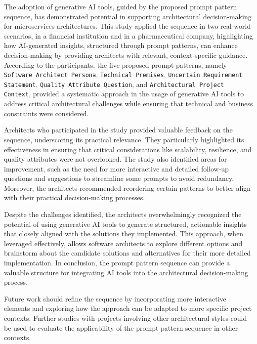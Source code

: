 \documentclass[runningheads]{llncs}
\begin{document}
The adoption of generative AI tools, guided by the proposed prompt pattern sequence, has demonstrated potential in supporting architectural decision-making for microservices architectures. 
This study applied the sequence in two real-world scenarios, in a financial institution and in a pharmaceutical company, highlighting how AI-generated insights, structured through prompt patterns, can enhance decision-making by providing architects with relevant, context-specific guidance. According to the participants, the five proposed prompt patterns, namely \texttt{Software Architect Persona}, \texttt{Technical Premises}, \texttt{Uncertain Requirement Statement}, \texttt{Quality Attribute Question}, and \texttt{Architectural Project Context}, provided a systematic approach in the usage of generative AI tools to address critical architectural challenges while ensuring that technical and business constraints were considered.

Architects who participated in the study provided valuable feedback on the sequence, underscoring its practical relevance. They particularly highlighted its effectiveness in ensuring that critical considerations like scalability, resilience, and quality attributes were not overlooked. The study also identified areas for improvement, such as the need for more interactive and detailed follow-up questions and suggestions to streamline some prompts to avoid redundancy. Moreover, the architects recommended reordering certain patterns to better align with their practical decision-making processes.

Despite the challenges identified, the architects overwhelmingly recognized the potential of using generative AI tools to generate structured, actionable insights that closely aligned with the solutions they implemented. This approach, when leveraged effectively, allows software architects to explore different options and brainstorm about the candidate solutions and alternatives for their more detailed implementation. In conclusion, the prompt pattern sequence can provide a valuable structure for integrating AI tools into the architectural decision-making process. 

Future work should refine the sequence by incorporating more interactive elements and exploring how the approach can be adapted to more specific project contexts. Further studies with projects involving other architectural styles could be used to evaluate the applicability of the prompt pattern sequence in other contexts.

\end{document}
